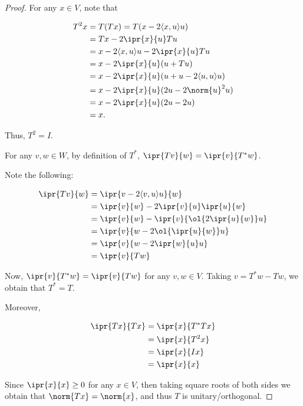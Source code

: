 \documentclass[11pt]{scrartcl}
\begin{document}
\begin{proof}
  \hfill

  For any $x\in V$, note that

  \begin{align}
    T^2x & = T(Tx) = T(x-2\langle x,u\rangle u)          \\
         & =Tx - 2 \ipr{x}{u}Tu                          \\
         & =x-2\langle x,u\rangle u - 2 \ipr{x}{u}Tu     \\
         & =x - 2 \ipr{x}{u}(u+Tu)                       \\
         & =x - 2 \ipr{x}{u}(u+ u-2\langle u,u\rangle u) \\
         & =x - 2 \ipr{x}{u}(2u - 2 \norm{u}^2u)         \\
         & =x - 2 \ipr{x}{u}(2u-2u)                      \\
         & =x.
  \end{align}

  Thus, $T^2 = I$.

  For any $v, w \in W$, by definition of $T^{*}$, $\ipr{Tv}{w}=\ipr{v}{T^{*}w}$.

  Note the following:

  \begin{align}
    \ipr{Tv}{w} & = \ipr{v-2\langle v,u\rangle u}{w}        \\
                & =\ipr{v}{w} - 2 \ipr{v}{u}\ipr{u}{w}      \\
                & =\ipr{v}{w} - \ipr{v}{\ol{2 \ipr{u}{w}}u} \\
                & =\ipr{v}{w-2\ol{ \ipr{u}{w} }u}           \\
                & =\ipr{v}{w- 2\ipr{w}{u}u }                \\
                & =\ipr{v}{Tw}
  \end{align}

  Now, $\ipr{v}{T^{*}w} = \ipr{v}{Tw}$ for any $v, w\in V$. Taking
  $v = T^{*}w - Tw$, we obtain that $T^{*} = T$.

  Moreover,

  \begin{align}
    \ipr{Tx}{Tx} & = \ipr{x}{T^{*}Tx} \\
                 & =\ipr{x}{T^{2}x}   \\
                 & =\ipr{x}{Ix}       \\
                 & =\ipr{x}{x}
  \end{align}

  Since $\ipr{x}{x} \geq 0$ for any $x\in V$, then taking square roots
  of both sides we obtain that $\norm{Tx} = \norm{x}$, and thus $T$ is unitary/orthogonal.


\end{proof}
\end{document}
